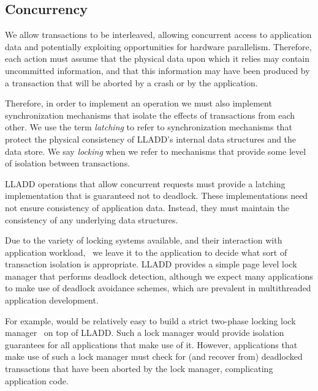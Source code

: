 \documentclass[letterpaper,english]{article}
\begin{document}
\subsection{Concurrency}

We allow transactions to be interleaved, allowing concurrent access to
application data and potentially exploiting opportunities for hardware
parallelism.  Therefore, each action must assume that the
physical data upon which it relies may contain uncommitted
information, and that this information may have been produced by a
transaction that will be aborted by a crash or by the application.


Therefore, in order to implement an operation we must also implement
synchronization mechanisms that isolate the effects of transactions
from each other.  We use the term {\em latching} to refer to
synchronization mechanisms that protect the physical consistency of
LLADD's internal data structures and the data store.  We say {\em
locking} when we refer to mechanisms that provide some level of
isolation between transactions.  

LLADD operations that allow concurrent requests must provide a
latching implementation that is guaranteed not to deadlock.  These
implementations need not ensure consistency of application data.
Instead, they must maintain the consistency of any underlying data
structures.

Due to the variety of locking systems available, and their interaction
with application workload,~\cite{multipleGenericLocking} we leave it
to the application to decide what sort of transaction isolation is
appropriate.  LLADD provides a simple page level lock manager that
performs deadlock detection, although we expect many applications to
make use of deadlock avoidance schemes, which are prevalent in
multithreaded application development.

For example, would be relatively easy to build a strict two-phase
locking lock
manager~\cite{hierarcicalLocking,hierarchicalLockingOnAriesExample} on
top of LLADD.  Such a lock manager would provide isolation guarantees
for all applications that make use of it.  However, applications that
make use of such a lock manager must check for (and recover from)
deadlocked transactions that have been aborted by the lock manager,
complicating application code.
\end{document}
